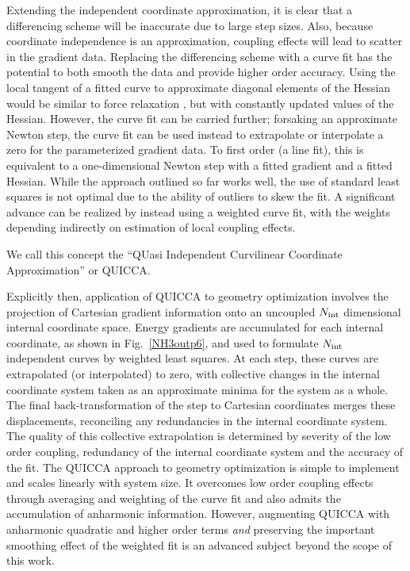 \documentclass[prl,aps,preprint,showpacs,superbib]{revtex4}
\begin{document}
Extending the independent coordinate approximation, it is clear that a differencing scheme will be inaccurate 
due to large step sizes.  Also, because coordinate independence is an approximation, coupling effects will lead
to scatter in the gradient data.  Replacing  the differencing scheme with a curve fit has the potential to both 
smooth the data and provide higher order accuracy.  Using the local tangent of a fitted curve to approximate 
diagonal elements of the Hessian 
would be similar to force relaxation \cite{pulay_review,sellers,van_alsenoy_98}, but with constantly updated 
values of the Hessian.  However, the curve fit can be carried further;  forsaking an approximate Newton step, 
the curve fit can be used instead to extrapolate or interpolate a zero for the parameterized gradient data.  
To first order (a line fit), this is equivalent to a one-dimensional Newton step with a fitted gradient and a 
fitted Hessian.   While the approach outlined so far works well, the use of standard least squares is not 
optimal due to the ability of outliers to skew the fit.  A significant advance can be realized by instead using 
a weighted curve fit, with the weights depending indirectly on estimation of local coupling effects. 

We call this concept the ``QUasi Independent Curvilinear Coordinate Approximation'' or QUICCA. 

Explicitly then, application of QUICCA to geometry optimization involves the  projection of Cartesian 
gradient information onto an uncoupled $N_{\rm int}$ dimensional internal coordinate space.  Energy gradients 
are accumulated for each internal coordinate, as shown in Fig.~\ref{NH3outp6}, and used to formulate 
$N_{\rm int}$ independent curves by weighted least squares.  At each step, these curves are extrapolated 
(or interpolated) to zero, with collective changes in the internal coordinate system taken as an approximate 
minima for the system as a whole. The final back-transformation of the step to Cartesian coordinates merges 
these displacements, reconciling any redundancies in the internal coordinate system. The quality of this 
collective extrapolation is determined by severity of the low order coupling, redundancy of the internal 
coordinate system and the accuracy of the fit.  The QUICCA approach to geometry optimization is simple to 
implement and scales linearly with system size.  It overcomes low order coupling effects through averaging and 
weighting of the curve fit and also admits the accumulation of anharmonic information.  However,  augmenting
QUICCA with anharmonic quadratic and higher order terms {\em and} preserving the important smoothing effect of 
the weighted fit is an advanced subject beyond the scope of this work. 
\end{document}
